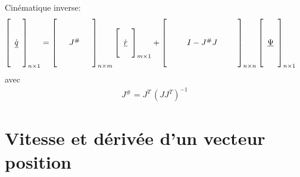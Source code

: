 Cinématique inverse:
\begin{align}
\left[ \begin{array}{c}  \\ \\ \dot{\underline{q}} \\ \\ \\
\end{array} \right]_{n \times 1}
&= 
\left[ \begin{array}{c c c} 
&&\\ &&\\ & J^{\#} & \\&& \\ &&
\end{array} \right]_{n \times m}
\left[ \begin{array}{c} 
\\ \dot{\underline{r}} \\ \\
\end{array} \right]_{m \times 1} + 
\left[ \begin{array}{c c c c c} 
&&&&\\ &&&&\\ && I - J^{\#}J && \\&&&& \\ &&&&
\end{array} \right]_{n \times n}
\left[ \begin{array}{c} 
\\ \\ \underline{\Psi} \\ \\ \\
\end{array} \right]_{n \times 1}
\end{align} 
avec
\begin{align}
J^{\#} = J^T\, (JJ^T)^{-1}
\end{align} 








\newpage
\section{Vitesse et dérivée d'un vecteur position}



